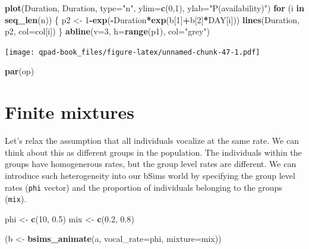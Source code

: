 \documentclass[12pt,]{book}
\newenvironment{Shaded}{\begin{snugshade}}{\end{snugshade}}
\newcommand{\ControlFlowTok}[1]{\textcolor[rgb]{0.13,0.29,0.53}{\textbf{#1}}}
\newcommand{\DataTypeTok}[1]{\textcolor[rgb]{0.13,0.29,0.53}{#1}}
\newcommand{\DecValTok}[1]{\textcolor[rgb]{0.00,0.00,0.81}{#1}}
\newcommand{\FloatTok}[1]{\textcolor[rgb]{0.00,0.00,0.81}{#1}}
\newcommand{\KeywordTok}[1]{\textcolor[rgb]{0.13,0.29,0.53}{\textbf{#1}}}
\newcommand{\NormalTok}[1]{#1}
\newcommand{\OperatorTok}[1]{\textcolor[rgb]{0.81,0.36,0.00}{\textbf{#1}}}
\newcommand{\StringTok}[1]{\textcolor[rgb]{0.31,0.60,0.02}{#1}}
\begin{document}
\begin{Shaded}
\begin{Highlighting}[]
\KeywordTok{plot}\NormalTok{(Duration, Duration, }\DataTypeTok{type=}\StringTok{"n"}\NormalTok{, }\DataTypeTok{ylim=}\KeywordTok{c}\NormalTok{(}\DecValTok{0}\NormalTok{,}\DecValTok{1}\NormalTok{),}
    \DataTypeTok{ylab=}\StringTok{"P(availability)"}\NormalTok{)}
\ControlFlowTok{for}\NormalTok{ (i }\ControlFlowTok{in} \KeywordTok{seq_len}\NormalTok{(n)) \{}
\NormalTok{    p2 <-}\StringTok{ }\DecValTok{1}\OperatorTok{-}\KeywordTok{exp}\NormalTok{(}\OperatorTok{-}\NormalTok{Duration}\OperatorTok{*}\KeywordTok{exp}\NormalTok{(b[}\DecValTok{1}\NormalTok{]}\OperatorTok{+}\NormalTok{b[}\DecValTok{2}\NormalTok{]}\OperatorTok{*}\NormalTok{DAY[i]))}
    \KeywordTok{lines}\NormalTok{(Duration, p2, }\DataTypeTok{col=}\NormalTok{col[i])}
\NormalTok{\}}
\KeywordTok{abline}\NormalTok{(}\DataTypeTok{v=}\DecValTok{3}\NormalTok{, }\DataTypeTok{h=}\KeywordTok{range}\NormalTok{(p1), }\DataTypeTok{col=}\StringTok{"grey"}\NormalTok{)}
\end{Highlighting}
\end{Shaded}

\texttt{[image: qpad-book\_files/figure-latex/unnamed-chunk-47-1.pdf]}

\begin{Shaded}
\begin{Highlighting}[]
\KeywordTok{par}\NormalTok{(op)}
\end{Highlighting}
\end{Shaded}

\hypertarget{finite-mixtures}{%
\section{Finite mixtures}\label{finite-mixtures}}

Let's relax the assumption that all individuals vocalize at the same rate.
We can think about this as different groups in the population.
The individuals within the groups have homogenerous rates,
but the group level rates are different.
We can introduce such heterogeneity into our bSims world by
specifying the group level rates (\texttt{phi} vector) and the
proportion of individuals belonging to the groups (\texttt{mix}).

\begin{Shaded}
\begin{Highlighting}[]
\NormalTok{phi <-}\StringTok{ }\KeywordTok{c}\NormalTok{(}\DecValTok{10}\NormalTok{, }\FloatTok{0.5}\NormalTok{)}
\NormalTok{mix <-}\StringTok{ }\KeywordTok{c}\NormalTok{(}\FloatTok{0.2}\NormalTok{, }\FloatTok{0.8}\NormalTok{)}

\NormalTok{(b <-}\StringTok{ }\KeywordTok{bsims_animate}\NormalTok{(a, }\DataTypeTok{vocal_rate=}\NormalTok{phi, }\DataTypeTok{mixture=}\NormalTok{mix))}
\end{Highlighting}
\end{Shaded}
\end{document}
